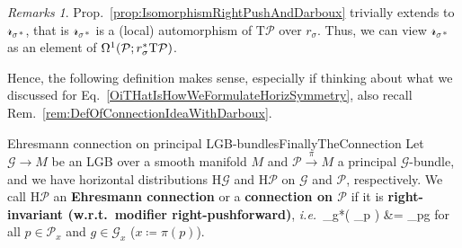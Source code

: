 \documentclass[a4paper,oneside,11pt,bibliography=totoc]{scrartcl}
\def\bas#1\eas{\begin{align*}#1\end{align*}}
\theoremstyle{plain}
\theoremstyle{remark}
\newtheorem{remark}[theorem]{Remarks}
\theoremstyle{definition}
\begin{document}
\begin{remark}\label{RSigmaAnAuto}
\leavevmode\newline
Prop.\ \ref{prop:IsomorphismRightPushAndDarboux} trivially extends to $\mathcal{r}_{\sigma*}$, that is $\mathcal{r}_{\sigma*}$ is a (local) automorphism of $\mathrm{T}\mathcal{P}$ over $r_\sigma$. Thus, we can view $\mathcal{r}_{\sigma*}$ as an element of $\Omega^1\mleft(\mathcal{P}; r_\sigma^*\mathrm{T}\mathcal{P}\mright)$.
\end{remark}

Hence, the following definition makes sense, especially if thinking about what we discussed for Eq.\ \eqref{OiTHatIsHowWeFormulateHorizSymmetry}, also recall Rem.\ \ref{rem:DefOfConnectionIdeaWithDarboux}.

\begin{definitions}{Ehresmann connection on principal LGB-bundles}{FinallyTheConnection}
Let $\mathcal{G} \to M$ be an LGB over a smooth manifold $M$ and $\mathcal{P} \stackrel{\pi}{\to} M$ a principal $\mathcal{G}$-bundle, and we have horizontal distributions $\mathrm{H}\mathcal{G}$ and $\mathrm{H}\mathcal{P}$ on $\mathcal{G}$ and $\mathcal{P}$, respectively. We call $\mathrm{H}\mathcal{P}$ an \textbf{Ehresmann connection} or a \textbf{connection on $\mathcal{P}$} if it is \textbf{right-invariant (w.r.t.\ modifier right-pushforward)}, \textit{i.e.}\
\bas
\mathcal{r}_{g*}\mleft( _p \mright)
&=
_{p\cdot g}
\eas
for all $p \in \mathcal{P}_x$ and $g \in \mathcal{G}_x$ ($x \coloneqq \pi(p)$).
\end{definitions}
\end{document}
